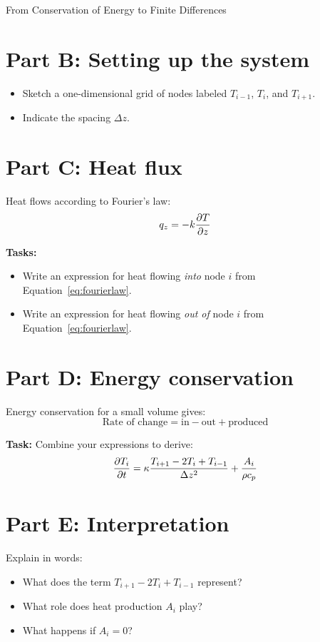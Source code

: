 \begin{activity}{From Conservation of Energy to Finite Differences}
\section*{Part B: Setting up the system}

\begin{itemize}
    \item Sketch a one-dimensional grid of nodes labeled $T_{i-1}$, $T_i$, and $T_{i+1}$.
    \item Indicate the spacing $\Delta z$.
\end{itemize}
\answerbox[4cm]

\section*{Part C: Heat flux}

Heat flows according to Fourier's law:
\begin{equation}
    q_z = -k \pdv{T}{z}
    \label{eq:fourierlaw}
\end{equation}

\textbf{Tasks:}
\begin{itemize}
    \item Write an expression for heat flowing \emph{into} node $i$ from Equation~\ref{eq:fourierlaw}.
    \item Write an expression for heat flowing \emph{out of} node $i$ from Equation~\ref{eq:fourierlaw}.
\end{itemize}
\answerbox[4cm]

\section*{Part D: Energy conservation}

Energy conservation for a small volume gives:
\[
    \text{Rate of change} = \text{in} - \text{out} + \text{produced}
\]

\textbf{Task:}
Combine your expressions to derive:
\begin{equation}
    \pdv{T_i}{t} =
    \kappa \frac{T_{i+1} - 2T_i + T_{i-1}}{\Delta z^2}
    + \frac{A_i}{\rho c_p}
\end{equation}
\answerbox[6cm]

\section*{Part E: Interpretation}

Explain in words:

\begin{itemize}
    \item What does the term $T_{i+1} - 2T_i + T_{i-1}$ represent?
    \item What role does heat production $A_i$ play?
    \item What happens if $A_i = 0$?
\end{itemize}
\answerbox[4cm]


\end{activity}
